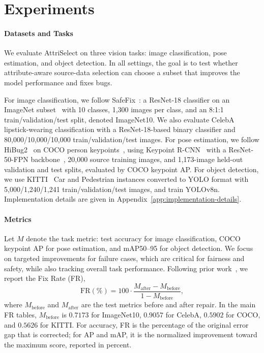 \documentclass{article}
\newcommand{\model}{AttriSelect\xspace}
\newcommand{\safefix}{SafeFix\xspace}
\begin{document}
\section{Experiments}

\paragraph{Datasets and Tasks}
We evaluate \model on three vision tasks: image classification, pose estimation, and object detection. In all settings, the goal is to test whether attribute-aware source-data selection can choose a subset that improves the model performance and fixes bugs.

For image classification, we follow \safefix~\citep{xu2025safefix}: a ResNet-18 classifier on an ImageNet subset~\citep{deng2009imagenet} with 10 classes, 1,300 images per class, and an 8:1:1 train/validation/test split, denoted ImageNet10. We also evaluate CelebA~\citep{liu2015deep} lipstick-wearing classification with a ResNet-18-based binary classifier and 80,000/10,000/10,000 train/validation/test images. For pose estimation, we follow HiBug2~\citep{chen2025hibug2} on COCO person keypoints~\citep{lin2014microsoft}, using Keypoint R-CNN~\citep{mask-rcnn-2017} with a ResNet-50-FPN backbone~\citep{he2016deep}, 20,000 source training images, and 1,173-image held-out validation and test splits, evaluated by COCO keypoint AP. For object detection, we use KITTI~\citep{geiger2012we} Car and Pedestrian instances converted to YOLO format with 5,000/1,240/1,241 train/validation/test images, and train YOLOv8n. Implementation details are given in Appendix~\ref{app:implementation-details}.

\paragraph{Metrics}
Let $M$ denote the task metric: test accuracy for image classification, COCO keypoint AP for pose estimation, and mAP50--95 for object detection. We focus on targeted improvements for failure cases, which are critical for fairness and safety, while also tracking overall task performance. Following prior work~\citep{lai2023improvingpredictionbackwardcompatiblilitynlp,xu2025safefix}, we report the Fix Rate (FR),
\begin{equation}
\mathrm{FR}(\%)=100\cdot\frac{M_{\mathrm{after}}-M_{\mathrm{before}}}{1-M_{\mathrm{before}}},
\end{equation}
where $M_{\mathrm{before}}$ and $M_{\mathrm{after}}$ are the test metrics before and after repair. In the main FR tables, $M_{\mathrm{before}}$ is $0.7173$ for ImageNet10, $0.9057$ for CelebA, $0.5902$ for COCO, and $0.5626$ for KITTI. For accuracy, FR is the percentage of the original error gap that is corrected; for AP and mAP, it is the normalized improvement toward the maximum score, reported in percent.
\end{document}
